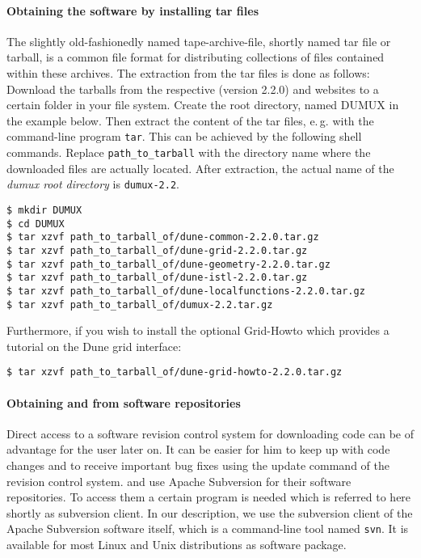 \paragraph{Obtaining the software by installing tar files}
The slightly old-fashionedly named tape-archive-file, shortly named tar file or tarball, is a common file format for distributing collections of files contained within these archives.
The extraction from the tar files is done as follows: 
Download the tarballs from the respective \Dune (version 2.2.0) and \Dumux websites to a certain folder in your file system.
Create the {\Dune} root directory, named DUMUX in the example below. Then extract the content of the tar files, e.\,g. with the command-line program \texttt{tar}.
This can be achieved by the following shell commands. Replace \texttt{path\_to\_tarball} with the directory name where the downloaded files are actually located.
After extraction, the actual name of the \emph{dumux root directory} is \texttt{dumux-2.2}. 

\begin{lstlisting}[style=Bash]
$ mkdir DUMUX
$ cd DUMUX
$ tar xzvf path_to_tarball_of/dune-common-2.2.0.tar.gz 
$ tar xzvf path_to_tarball_of/dune-grid-2.2.0.tar.gz 
$ tar xzvf path_to_tarball_of/dune-geometry-2.2.0.tar.gz 
$ tar xzvf path_to_tarball_of/dune-istl-2.2.0.tar.gz 
$ tar xzvf path_to_tarball_of/dune-localfunctions-2.2.0.tar.gz 
$ tar xzvf path_to_tarball_of/dumux-2.2.tar.gz
\end{lstlisting}

Furthermore, if you wish to install the optional \Dune Grid-Howto which provides a tutorial on the Dune grid interface:

\begin{lstlisting}[style=Bash]
$ tar xzvf path_to_tarball_of/dune-grid-howto-2.2.0.tar.gz
\end{lstlisting}

\paragraph{Obtaining \Dune and \Dumux from software repositories} 

Direct access to a software revision control system for downloading code can be of advantage for the user later on. 
It can be easier for him to keep up with code changes and to receive important bug fixes using the update command of the revision control system. 
\Dune and \Dumux use Apache Subversion for their software repositories. To access them a certain program is needed which is referred to here shortly as subversion client. 
In our description, we use the subversion client of the Apache Subversion software itself, which is a command-line tool named \texttt{svn}. 
It is available for most Linux and Unix distributions as software package.

